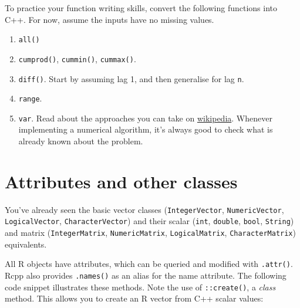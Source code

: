\begin{Shaded}
\begin{Highlighting}[]


  \NormalTok{ (}
\NormalTok{  \}}

\NormalTok{\}}
\end{Highlighting}
\end{Shaded}

To practice your function writing skills, convert the following
functions into C++. For now, assume the inputs have no missing values.

\begin{enumerate}
\def\labelenumi{\arabic{enumi}.}
\item
  \texttt{all()}
\item
  \texttt{cumprod()}, \texttt{cummin()}, \texttt{cummax()}.
\item
  \texttt{diff()}. Start by assuming lag 1, and then generalise for lag
  \texttt{n}.
\item
  \texttt{range}.
\item
  \texttt{var}. Read about the approaches you can take on
  \href{http://en.wikipedia.org/wiki/Algorithms_for_calculating_variance}{wikipedia}.
  Whenever implementing a numerical algorithm, it's always good to check
  what is already known about the problem.
\end{enumerate}

\hypertarget{rcpp-classes}{%
\section{Attributes and other classes}\label{rcpp-classes}}

You've already seen the basic vector classes (\texttt{IntegerVector},
\texttt{NumericVector}, \texttt{LogicalVector},
\texttt{CharacterVector}) and their scalar (\texttt{int},
\texttt{double}, \texttt{bool}, \texttt{String}) and matrix
(\texttt{IntegerMatrix}, \texttt{NumericMatrix}, \texttt{LogicalMatrix},
\texttt{CharacterMatrix}) equivalents.

All R objects have attributes, which can be queried and modified with
\texttt{.attr()}. Rcpp also provides \texttt{.names()} as an alias for
the name attribute. The following code snippet illustrates these
methods. Note the use of \texttt{::create()}, a \emph{class} method.
This allows you to create an R vector from C++ scalar values:
 


